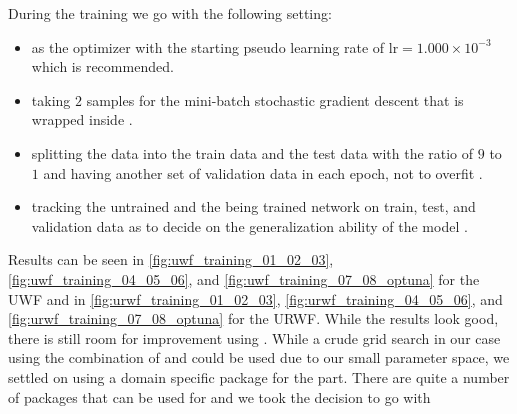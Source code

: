 During the training we go with the following setting:
\begin{itemize}
  \item \adam\cite{Kingma2014}\index{\adam} as the optimizer with the starting pseudo learning rate of $\mathrm{lr}=1.000\times10^{-3}$ which is recommended\cite{Kingma2014}\cite{Sun2019}.
  \item taking $2$  samples for the mini-batch stochastic gradient descent that is wrapped inside \adam\cite{Kingma2014}\index{\adam}.
  \item splitting the data into the train data and the test data with the ratio of $9$ to $1$ and having another set of 
  validation data in each epoch, not to overfit \cite{Chollet2023}.
  \item tracking the untrained  and the being trained network on train, test, and validation data as to decide on the generalization ability of the model \cite{Chollet2023}.
\end{itemize}
Results can be seen in \cref{fig:uwf_training_01_02_03}, \ref{fig:uwf_training_04_05_06}, and \ref{fig:uwf_training_07_08_optuna} for the 
\ac{UWF} and in \cref{fig:urwf_training_01_02_03}, \ref{fig:urwf_training_04_05_06}, and \ref{fig:urwf_training_07_08_optuna} 
for the \ac{URWF}. While the results look good, there is still room for improvement using \ho\cite{Hutter2019}\cite{Akiba2019}\index{\ho}. 
While a crude grid search in our case using the combination of \bash\cite{Ramey2022}\index{\bash} and \awk\cite{Robbins2023}\index{\awk}  could be used due to our small parameter space, we settled on 
using a domain specific package for the \ho\cite{Hutter2019}\cite{Akiba2019}\index{\ho} part. There are quite a number of packages that can be used for \ho\cite{Hutter2019}\cite{Akiba2019}\index{\ho} and we took the decision to go with 
